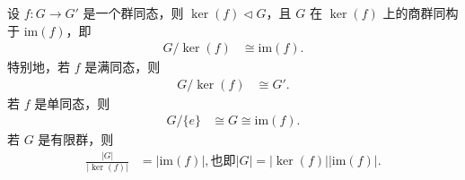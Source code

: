 \documentclass[../../main.tex]{subfiles}
\begin{document}
\begin{theorem}[群同构第一定理]\label{theorem:群同构第一定理}
设 \(f: G \to G'\) 是一个群同态，则 \(\ker(f) \lhd G\)，且 \(G\) 在 \(\ker(f)\) 上的商群同构于 \(\mathrm{im}(f)\)，即
\begin{align*}
G/\ker(f) &\cong \mathrm{im}(f) .
\end{align*}
特别地，若 \(f\) 是满同态，则
\begin{align*}
G/\ker(f) &\cong G' .
\end{align*}
若 \(f\) 是单同态，则
\begin{align*}
G/\{e\} &\cong G \cong \mathrm{im}(f).
\end{align*}
若 \(G\) 是有限群，则
\begin{align*}
\frac{|G|}{|\ker(f)|} &= |\mathrm{im}(f)| ,\text{也即}|G|=|\ker(f)||\mathrm{im}(f)|.
\end{align*}
\end{theorem}
\end{document}
